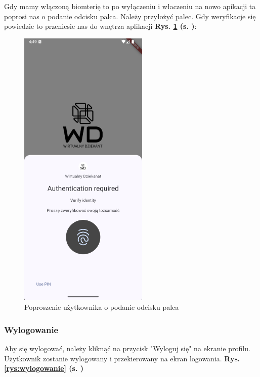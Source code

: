 \newpage
Gdy mamy włączoną biomterię to po wyłączeniu i właczeniu na nowo apikacji ta poprosi nas o podanie odcisku palca. Należy przyłożyć palec. Gdy weryfikacje się powiedzie to przeniesie nas do wnętrza aplikacji \textbf{Rys. \ref{rys:biomteriaON2} (s. \pageref{rys:biomteriaON2})}:
\begin{figure}[h!]
	\centering
	\includegraphics[width=0.55\textwidth]{rys/biometericON2.png}
	\caption{Poproszenie użytkownika o podanie odcisku palca}
	\label{rys:biomteriaON2}
\end{figure}

\newpage
\subsubsection{Wylogowanie}

Aby się wylogować, należy kliknąć na przycisk "Wyloguj się" na ekranie profilu. Użytkownik zostanie wylogowany i przekierowany na ekran logowania. \textbf{Rys. \ref{rys:wylogowanie} (s. \pageref{rys:wylogowanie})}

